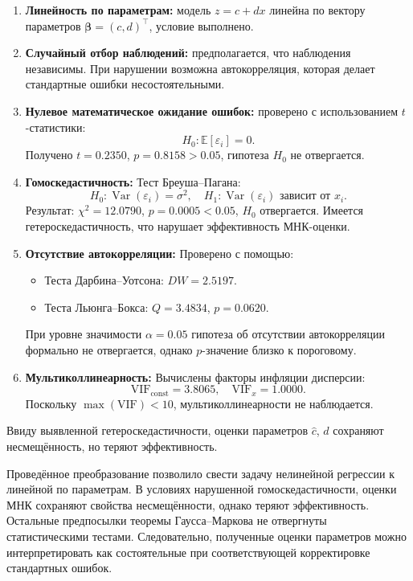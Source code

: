 \begin{enumerate}
    \item \textbf{Линейность по параметрам:} модель $z = c + d x$ линейна по вектору параметров $\boldsymbol{\beta} = (c, d)^\top$, условие выполнено.

    \item \textbf{Случайный отбор наблюдений:} предполагается, что наблюдения независимы. При нарушении возможна автокорреляция, которая делает стандартные ошибки несостоятельными.

    \item \textbf{Нулевое математическое ожидание ошибок:} проверено с использованием $t$-статистики:
    \[
    H_0: \mathbb{E}[\varepsilon_i] = 0.
    \]
    Получено $t = 0.2350$, $p = 0.8158 > 0.05$, гипотеза $H_0$ не отвергается.

    \item \textbf{Гомоскедастичность:} Тест Бреуша–Пагана:
    \[
    H_0: \operatorname{Var}(\varepsilon_i) = \sigma^2, \quad H_1: \operatorname{Var}(\varepsilon_i) \text{ зависит от } x_i.
    \]
    Результат: $\chi^2 = 12.0790$, $p = 0.0005 < 0.05$, $H_0$ отвергается. Имеется гетероскедастичность, что нарушает эффективность МНК-оценки.

    \item \textbf{Отсутствие автокорреляции:} Проверено с помощью:
    \begin{itemize}
        \item Теста Дарбина–Уотсона: $DW = 2.5197$.
        \item Теста Льюнга–Бокса: $Q = 3.4834$, $p = 0.0620$.
    \end{itemize}
    При уровне значимости $\alpha = 0.05$ гипотеза об отсутствии автокорреляции формально не отвергается, однако $p$-значение близко к пороговому.

    \item \textbf{Мультиколлинеарность:} Вычислены факторы инфляции дисперсии:
    \[
    \text{VIF}_{\text{const}} = 3.8065, \quad \text{VIF}_{x} = 1.0000.
    \]
    Поскольку $\max(\text{VIF}) < 10$, мультиколлинеарности не наблюдается.
\end{enumerate}

\begin{remark}
Ввиду выявленной гетероскедастичности, оценки параметров $\hat{c}$, $\hat{d}$ сохраняют несмещённость, но теряют эффективность.
\end{remark}

\begin{answer}
Проведённое преобразование позволило свести задачу нелинейной регрессии к линейной по параметрам. В условиях нарушенной гомоскедастичности, оценки МНК сохраняют свойства несмещённости, однако теряют эффективность. Остальные предпосылки теоремы Гаусса–Маркова не отвергнуты статистическими тестами. Следовательно, полученные оценки параметров можно интерпретировать как состоятельные при соответствующей корректировке стандартных ошибок.
\end{answer}

